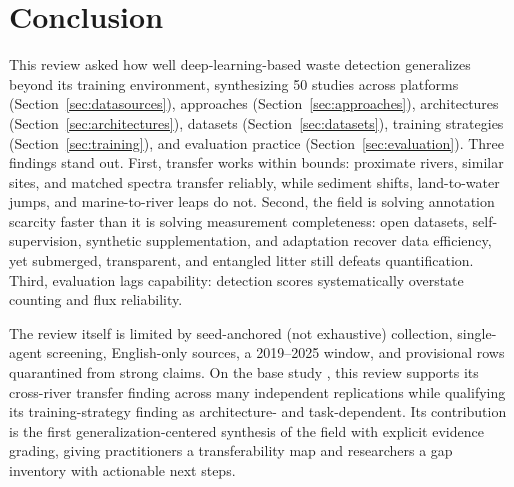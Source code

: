 \section{Conclusion}
\label{sec:conclusion}

This review asked how well deep-learning-based waste detection generalizes beyond its training environment, synthesizing 50 studies across platforms (Section~\ref{sec:datasources}), approaches (Section~\ref{sec:approaches}), architectures (Section~\ref{sec:architectures}), datasets (Section~\ref{sec:datasets}), training strategies (Section~\ref{sec:training}), and evaluation practice (Section~\ref{sec:evaluation}). Three findings stand out. First, transfer works within bounds: proximate rivers, similar sites, and matched spectra transfer reliably, while sediment shifts, land-to-water jumps, and marine-to-river leaps do not. Second, the field is solving annotation scarcity faster than it is solving measurement completeness: open datasets, self-supervision, synthetic supplementation, and adaptation recover data efficiency, yet submerged, transparent, and entangled litter still defeats quantification. Third, evaluation lags capability: detection scores systematically overstate counting and flux reliability.

The review itself is limited by seed-anchored (not exhaustive) collection, single-agent screening, English-only sources, a 2019--2025 window, and provisional rows quarantined from strong claims. On the base study \cite{Pati2025}, this review supports its cross-river transfer finding across many independent replications while qualifying its training-strategy finding as architecture- and task-dependent. Its contribution is the first generalization-centered synthesis of the field with explicit evidence grading, giving practitioners a transferability map and researchers a gap inventory with actionable next steps.
